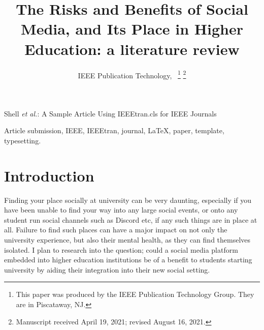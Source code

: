 \documentclass[lettersize,journal]{IEEEtran}
\begin{document}
\title{The Risks and Benefits of Social Media, and Its Place in Higher Education: a literature review}

\author{IEEE Publication Technology,~
\thanks{This paper was produced by the IEEE Publication Technology Group. They are in Piscataway, NJ.}%
\thanks{Manuscript received April 19, 2021; revised August 16, 2021.}}

%
{Shell \MakeLowercase{\textit{et al.}}: A Sample Article Using IEEEtran.cls for IEEE Journals}


\maketitle

\begin{abstract}
\end{abstract}

\begin{IEEEkeywords}
Article submission, IEEE, IEEEtran, journal, \LaTeX, paper, template, typesetting.
\end{IEEEkeywords}

\section{Introduction}
        Finding your place socially at university can be very daunting,
        especially if you have been unable to find your way into any large
        social events, or onto any student run social channels such as Discord
        etc, if any such things are in place at all. Failure to find such
        places can have a major impact on not only the university experience,
        but also their mental health, as they can find themselves isolated. I
        plan to research into the question; could a social media platform 
        embedded into higher education institutions be of a benefit to 
        students starting university by aiding their integration into their new
        social setting.
\end{document}
